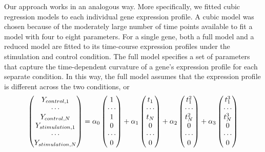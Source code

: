 Our approach works in an analogous way.
More specifically, we fitted cubic regression models to each 
individual gene expression profile. A cubic model was chosen 
because of the moderately large number of time points 
available to fit a model with four to eight parameters. 
For a single gene, both a full model and a reduced model are 
fitted to its time-course expression profiles under the 
stimulation and control condition. The full model specifies 
a set of parameters that capture the time-dependent curvature
of a gene's expression profile for each separate condition. 
In this way, the full model assumes that the expression 
profile is different across the two conditions, or
\begin{eqnarray}
\begin{pmatrix}
Y_{control,1}\\
\cdots\\
Y_{control,N}\\
Y_{stimulation,1}\\
\cdots\\
Y_{stimulation,N}
\end{pmatrix}
%
&= \alpha_0 
\begin{pmatrix}
1\\
\cdots\\
1\\
0\\
\cdots\\
0
\end{pmatrix}
%
+ \alpha_1 
\begin{pmatrix}
t_1\\
\cdots\\
t_N\\
0\\
\cdots\\
0
\end{pmatrix}
%
+ \alpha_2 
\begin{pmatrix}
t_1^2\\
\cdots\\
t_N^2\\
0\\
\cdots\\
0
\end{pmatrix}
%
+ \alpha_3
\begin{pmatrix}
t_1^3\\
\cdots\\
t_N^3\\
0\\
\cdots\\
0
\end{pmatrix}\notag \\

\end{eqnarray}
